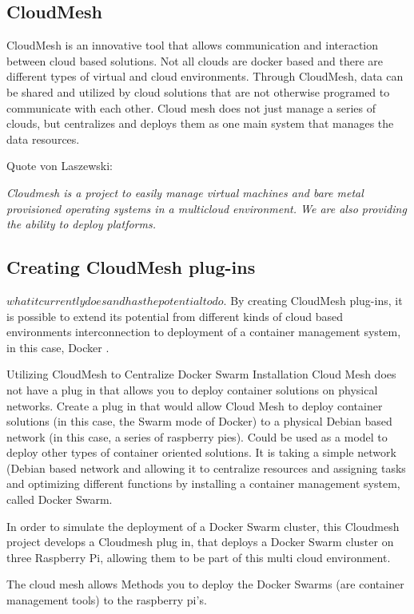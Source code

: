 	
\subsection{CloudMesh}

CloudMesh is an innovative tool that allows communication and
interaction between cloud based solutions. Not all clouds are docker
based and there are different types of virtual and cloud
environments. Through CloudMesh, data can be shared and utilized by
cloud solutions that are not otherwise programed to communicate with
each other.  Cloud mesh does not just manage a series of clouds, but
centralizes and deploys them as one main system that manages the data
resources.
	
Quote von Laszewski:

\emph{Cloudmesh is a project to easily manage virtual machines and
  bare metal provisioned operating systems in a multicloud
  environment.  We are also providing the ability to deploy
  platforms.}
	
\subsection{Creating CloudMesh plug-ins}

$what it currently does and has the potential to do$.  By creating
CloudMesh plug-ins, it is possible to extend its potential from
different kinds of cloud based environments interconnection to
deployment of a container management system, in this case, Docker .
	
Utilizing CloudMesh to Centralize Docker Swarm Installation Cloud Mesh
does not have a plug in that allows you to deploy container solutions
on physical networks.  Create a plug in that would allow Cloud Mesh to
deploy container solutions (in this case, the Swarm mode of Docker) to
a physical Debian based network (in this case, a series of raspberry
pies).  Could be used as a model to deploy other types of container
oriented solutions.  It is taking a simple network (Debian based
network and allowing it to centralize resources and assigning tasks
and optimizing different functions by installing a container
management system, called Docker Swarm.
	
In order to simulate the deployment of a Docker Swarm cluster, this
Cloudmesh project develops a Cloudmesh plug in, that deploys a Docker
Swarm cluster on three Raspberry Pi, allowing them to be part of this
multi cloud environment.
	
The cloud mesh allows Methods you to deploy the Docker Swarms (are
container management tools) to the raspberry pi's.
	
